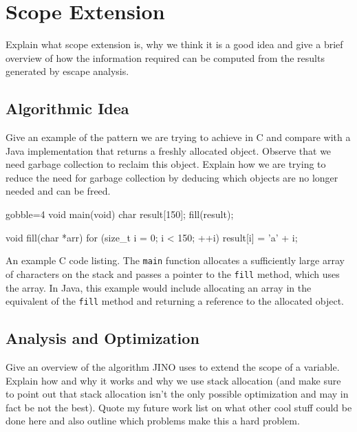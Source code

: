 
\chapter{Scope Extension}
	\label{chapter:scopeext}
	Explain what scope extension is, why we think it is a good idea and give a brief overview of how the information
	required can be computed from the results generated by escape analysis.

	\section{Algorithmic Idea}
		\label{sec:scopeext:idea}
		Give an example of the pattern we are trying to achieve in C and compare with a Java implementation that returns
		a freshly allocated object. Observe that we need garbage collection to reclaim this object. Explain how we are
		trying to reduce the need for garbage collection by deducing which objects are no longer needed and can be freed.

		\begin{listing}
			\begin{ccode*}{gobble=4}
				void main(void) {
					char result[150];
					fill(result);
				}

				void fill(char *arr) {
					for (size_t i = 0; i < 150; ++i) {
						result[i] = 'a' + i;
					}
				}
			\end{ccode*}
			\caption[An example C code listing.]{An example C code listing. The \texttt{main} function allocates
			a sufficiently large array of characters on the stack and passes a pointer to the \texttt{fill} method, which uses
			the array. In Java, this example would include allocating an array in the equivalent of the \texttt{fill} method
			and returning a reference to the allocated object.}
			\label{lst:scopeext:idea:c-example}
		\end{listing}

	\section{Analysis and Optimization}
		\label{sec:scopeext:analysis}
		Give an overview of the algorithm JINO uses to extend the scope of a variable. Explain how and why it works and why
		we use stack allocation (and make sure to point out that stack allocation isn't the only possible optimization and
		may in fact be not the best). Quote my future work list on what other cool stuff could be done here and also outline
		which problems make this a hard problem.

